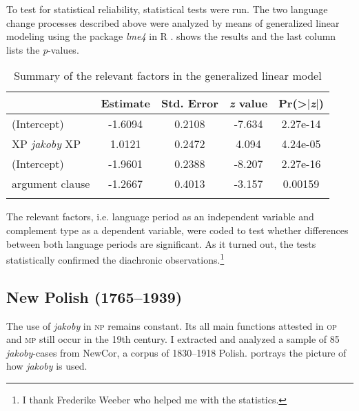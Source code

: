 \documentclass[output=paper]{langsci/langscibook}
\begin{document}
To test for statistical reliability, statistical tests were run. The two language change processes described above were analyzed by means of generalized linear modeling using the package \emph{lme4} \citep{Bates-Maechler-etal2012} in R \citep{Team2012}.  shows the results and the last column lists the \emph{p}-values.

 \begin{table}[h] \begin{tabular}{l*{3}{S[table-format=-1.5]}S[table-format=1.2e4]}
\lsptoprule
{} & {Estimate} & {Std. Error} & {\emph{z} value} & {Pr(>$\mid$\emph{z}$\mid$)} \\
\midrule
(Intercept) & -1.6094 & 0.2108 & -7.634 & 2.27e-14 \\
XP \emph{jakoby} XP & 1.0121 & 0.2472 & 4.094 & 4.24e-05 \\
(Intercept) & -1.9601 & 0.2388 & -8.207 & 2.27e-16 \\
argument clause & -1.2667 & 0.4013 & -3.157 & 0.00159 \\
 \lspbottomrule
\end{tabular}
\caption{Summary of the relevant factors in the generalized linear model} \label{static}
\end{table}

The relevant factors, i.e. language period as an independent variable and complement type as a dependent variable, were coded to test whether differences between both language periods are significant. As it turned out, the tests statistically confirmed the diachronic observations.\footnote{I thank Frederike Weeber who helped me with the statistics.
}

\subsection{New Polish (1765--1939)}

The use of \emph{jakoby} in \textsc{np} remains constant. Its all main functions attested in \textsc{op} and \textsc{mp} still occur in the 19th century. I extracted and analyzed a sample of 85 \emph{jakoby}-cases from NewCor, a corpus of 1830--1918 Polish.  portrays the picture of how \emph{jakoby} is used.

\begin{table}[h]
\caption{The use of \emph{jakoby} in the NewCor corpus} \label{nowopolski_statystka}
\end{table}
\end{document}
